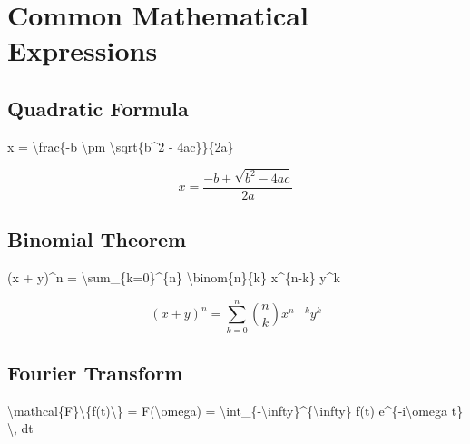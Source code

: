 \documentclass[
  letterpaper,
  DIV=11,
  numbers=noendperiod]{scrartcl}
\newenvironment{Shaded}{\begin{snugshade}}{\end{snugshade}}
\newcommand{\SpecialCharTok}[1]{\textcolor[rgb]{0.37,0.37,0.37}{#1}}
\newcommand{\SpecialStringTok}[1]{\textcolor[rgb]{0.13,0.47,0.30}{#1}}
\begin{document}
\hypertarget{common-mathematical-expressions}{%
\section{Common Mathematical
Expressions}\label{common-mathematical-expressions}}

\hypertarget{quadratic-formula}{%
\subsection{Quadratic Formula}\label{quadratic-formula}}

\begin{Shaded}
\begin{Highlighting}[]
\SpecialStringTok{$$x = }\SpecialCharTok{\textbackslash{}frac}\SpecialStringTok{\{{-}b }\SpecialCharTok{\textbackslash{}pm}\SpecialStringTok{ }\SpecialCharTok{\textbackslash{}sqrt}\SpecialStringTok{\{b\^{}2 {-} 4ac\}\}\{2a\}$$}
\end{Highlighting}
\end{Shaded}

\[x = \frac{-b \pm \sqrt{b^2 - 4ac}}{2a}\]

\hypertarget{binomial-theorem}{%
\subsection{Binomial Theorem}\label{binomial-theorem}}

\begin{Shaded}
\begin{Highlighting}[]
\SpecialStringTok{$$(x + y)\^{}n = }\SpecialCharTok{\textbackslash{}sum}\SpecialStringTok{\_\{k=0\}\^{}\{n\} }\SpecialCharTok{\textbackslash{}binom}\SpecialStringTok{\{n\}\{k\} x\^{}\{n{-}k\} y\^{}k$$}
\end{Highlighting}
\end{Shaded}

\[(x + y)^n = \sum_{k=0}^{n} \binom{n}{k} x^{n-k} y^k\]

\hypertarget{fourier-transform}{%
\subsection{Fourier Transform}\label{fourier-transform}}

\begin{Shaded}
\begin{Highlighting}[]
\SpecialStringTok{$$}\SpecialCharTok{\textbackslash{}mathcal}\SpecialStringTok{\{F\}}\SpecialCharTok{\textbackslash{}\{}\SpecialStringTok{f(t)}\SpecialCharTok{\textbackslash{}\}}\SpecialStringTok{ = F(}\SpecialCharTok{\textbackslash{}omega}\SpecialStringTok{) = }\SpecialCharTok{\textbackslash{}int}\SpecialStringTok{\_\{{-}}\SpecialCharTok{\textbackslash{}infty}\SpecialStringTok{\}\^{}\{}\SpecialCharTok{\textbackslash{}infty}\SpecialStringTok{\} f(t) e\^{}\{{-}i}\SpecialCharTok{\textbackslash{}omega}\SpecialStringTok{ t\} }\SpecialCharTok{\textbackslash{},}\SpecialStringTok{ dt$$}
\end{Highlighting}
\end{Shaded}
\end{document}
